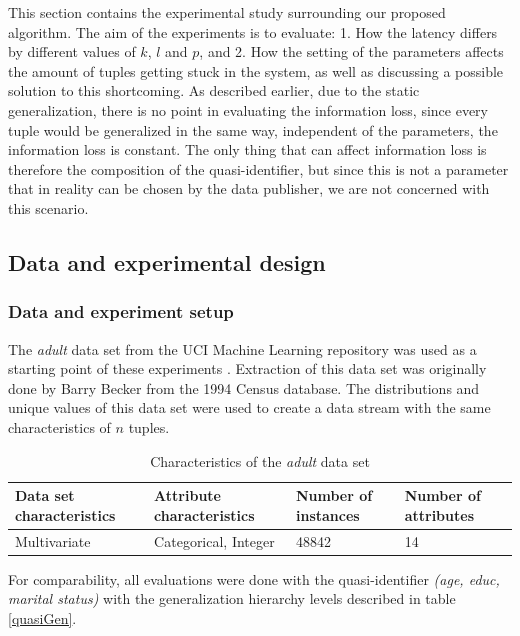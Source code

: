 \noindent This section contains the experimental study surrounding our proposed algorithm. The aim of the experiments is to evaluate: 1. How the latency differs by different values of $k$, $l$ and $p$, and 2. How the setting of the parameters affects the amount of tuples getting stuck in the system, as well as discussing a possible solution to this shortcoming. As described earlier, due to the static generalization, there is no point in evaluating the information loss, since every tuple would be generalized in the same way, independent of the parameters, the information loss is constant. The only thing that can affect information loss is therefore the composition of the quasi-identifier, but since this is not a parameter that in reality can be chosen by the data publisher, we are not concerned with this scenario.
\\
\subsection{Data and experimental design}

\subsubsection{Data and experiment setup}

The \textit{adult} data set from the UCI Machine Learning repository was used as a starting point of these experiments \cite{dua2017}. Extraction of this data set was originally done by Barry Becker from the 1994 Census database. The distributions and unique values of this data set were used to create a data stream with the same characteristics of $n$ tuples. 

\begin{table}[H]
\centering
\begin{tabular}{llll}
\toprule
Data set characteristics & Attribute characteristics & Number of instances & Number of attributes \\ \hline
Multivariate             & Categorical, Integer      & 48842               & 14                   \\ \bottomrule
\end{tabular}
\caption{Characteristics of the \textit{adult} data set}
\label{datacharac}
\end{table}

\noindent For comparability, all evaluations were done with the quasi-identifier \textit{(age, educ, marital status)} with the generalization hierarchy levels described in table \ref{quasiGen}.

